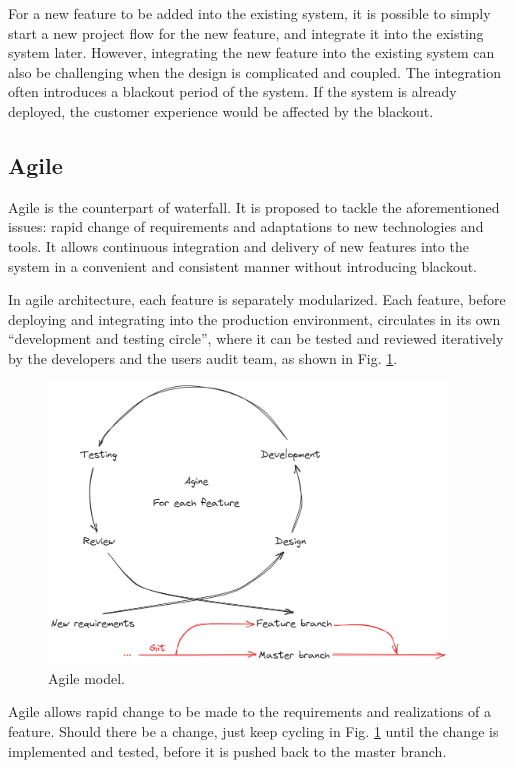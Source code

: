 For a new feature to be added into the existing system, it is possible to simply start a new project flow for the new feature, and integrate it into the existing system later. However, integrating the new feature into the existing system can also be challenging when the design is complicated and coupled. The integration often introduces a blackout period of the system. If the system is already deployed, the customer experience would be affected by the blackout.

\subsection{Agile}

Agile is the counterpart of waterfall. It is proposed to tackle the aforementioned issues: rapid change of requirements and adaptations to new technologies and tools. It allows continuous integration and delivery of new features into the system in a convenient and consistent manner without introducing blackout.

In agile architecture, each feature is separately modularized. Each feature, before deploying and integrating into the production environment, circulates in its own ``development and testing circle'', where it can be tested and reviewed iteratively by the developers and the users audit team, as shown in Fig. \ref{ch:cicd:fig:agile}.
\begin{figure}[!htb]
	\centering
	\includegraphics[width=300pt]{chapters/ap/figures/agile.png}
	\caption{Agile model.} \label{ch:cicd:fig:agile}
\end{figure}

Agile allows rapid change to be made to the requirements and realizations of a feature. Should there be a change, just keep cycling in Fig. \ref{ch:cicd:fig:agile} until the change is implemented and tested, before it is pushed back to the master branch.

